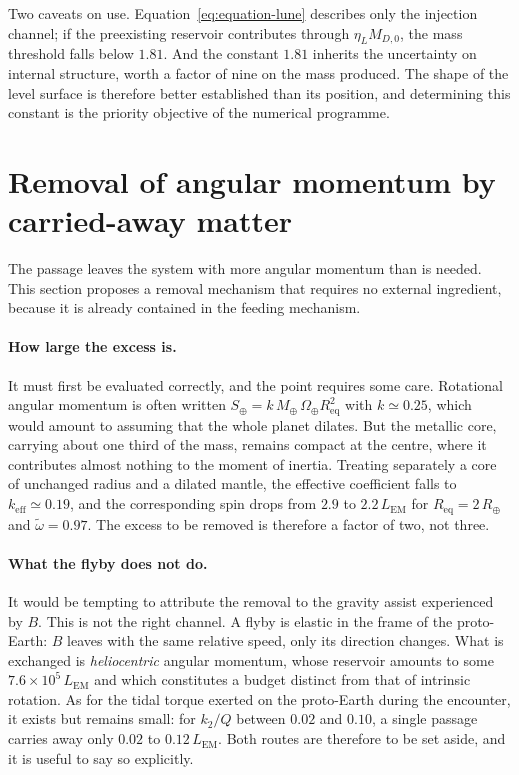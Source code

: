 \documentclass[11pt,a4paper,openany]{report}
\newcommand{\Mt}{M_{\oplus}}
\newcommand{\Rt}{R_{\oplus}}
\newcommand{\Req}{R_{\mathrm{eq}}}
\begin{document}
\begin{controle}
Two caveats on use. Equation~\eqref{eq:equation-lune} describes only the injection channel; if the
preexisting reservoir contributes through $\eta_L M_{D,0}$, the mass threshold falls below $1.81$.
And the constant $1.81$ inherits the uncertainty on internal structure, worth a factor of nine on
the mass produced. The shape of the level surface is therefore better established than its
position, and determining this constant is the priority objective of the numerical programme.
\end{controle}



\section{Removal of angular momentum by carried-away matter}
\label{sec:evacuation}

The passage leaves the system with more angular momentum than is needed. This section proposes a
removal mechanism that requires no external ingredient, because it is already contained in the
feeding mechanism.

\paragraph{How large the excess is.} It must first be evaluated correctly, and the point requires
some care. Rotational angular momentum is often written $S_\oplus=k\,\Mt\,\Omega_\oplus\Req^{2}$
with $k\simeq0.25$, which would amount to assuming that the whole planet dilates. But the metallic
core, carrying about one third of the mass, remains compact at the centre, where it contributes
almost nothing to the moment of inertia. Treating separately a core of unchanged radius and a
dilated mantle, the effective coefficient falls to $k_{\mathrm{eff}}\simeq0.19$, and the
corresponding spin drops from $2.9$ to $2.2\,L_{\mathrm{EM}}$ for $\Req=2\,\Rt$ and
$\tilde\omega=0.97$. The excess to be removed is therefore a factor of two, not three.

\paragraph{What the flyby does not do.} It would be tempting to attribute the removal to the
gravity assist experienced by $B$. This is not the right channel. A flyby is elastic in the frame
of the proto-Earth: $B$ leaves with the same relative speed, only its direction changes. What is
exchanged is \emph{heliocentric} angular momentum, whose reservoir amounts to some
$7.6\times10^{5}\,L_{\mathrm{EM}}$ and which constitutes a budget distinct from that of intrinsic
rotation. As for the tidal torque exerted on the proto-Earth during the encounter, it exists but
remains small: for $k_2/Q$ between $0.02$ and $0.10$, a single passage carries away only $0.02$ to
$0.12\,L_{\mathrm{EM}}$. Both routes are therefore to be set aside, and it is useful to say so
explicitly.
\end{document}
